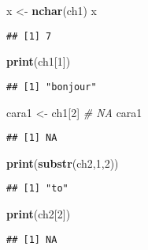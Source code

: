 \documentclass[
]{article}
\newenvironment{Shaded}{\begin{snugshade}}{\end{snugshade}}
\newcommand{\CommentTok}[1]{\textcolor[rgb]{0.56,0.35,0.01}{\textit{#1}}}
\newcommand{\DecValTok}[1]{\textcolor[rgb]{0.00,0.00,0.81}{#1}}
\newcommand{\FunctionTok}[1]{\textcolor[rgb]{0.13,0.29,0.53}{\textbf{#1}}}
\newcommand{\NormalTok}[1]{#1}
\newcommand{\OtherTok}[1]{\textcolor[rgb]{0.56,0.35,0.01}{#1}}
\begin{document}
\begin{Shaded}
\begin{Highlighting}[]
\NormalTok{x }\OtherTok{\textless{}{-}} \FunctionTok{nchar}\NormalTok{(ch1)}
\NormalTok{x}
\end{Highlighting}
\end{Shaded}

\begin{verbatim}
## [1] 7
\end{verbatim}

\begin{Shaded}
\begin{Highlighting}[]
\FunctionTok{print}\NormalTok{(ch1[}\DecValTok{1}\NormalTok{])}
\end{Highlighting}
\end{Shaded}

\begin{verbatim}
## [1] "bonjour"
\end{verbatim}

\begin{Shaded}
\begin{Highlighting}[]
\NormalTok{cara1 }\OtherTok{\textless{}{-}}\NormalTok{ ch1[}\DecValTok{2}\NormalTok{] }\CommentTok{\# NA }
\NormalTok{cara1}
\end{Highlighting}
\end{Shaded}

\begin{verbatim}
## [1] NA
\end{verbatim}

\begin{Shaded}
\begin{Highlighting}[]
\FunctionTok{print}\NormalTok{(}\FunctionTok{substr}\NormalTok{(ch2,}\DecValTok{1}\NormalTok{,}\DecValTok{2}\NormalTok{))}
\end{Highlighting}
\end{Shaded}

\begin{verbatim}
## [1] "to"
\end{verbatim}

\begin{Shaded}
\begin{Highlighting}[]
\FunctionTok{print}\NormalTok{(ch2[}\DecValTok{2}\NormalTok{])}
\end{Highlighting}
\end{Shaded}

\begin{verbatim}
## [1] NA
\end{verbatim}
\end{document}
